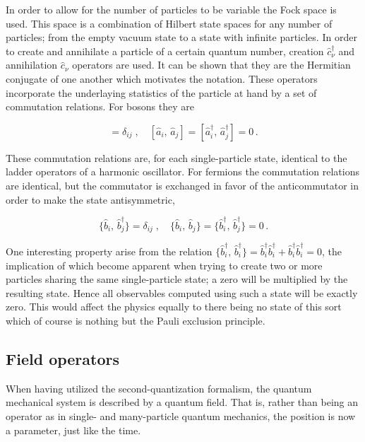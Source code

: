 \documentclass[12pt]{report}
\begin{document}
In order to allow for the number of particles to be variable the Fock space is used. This space is a combination of Hilbert state spaces for any number of particles; from the empty vacuum state to a state with infinite particles. In order to create and annihilate a particle of a certain quantum number, creation $ \hat c^\dagger_\nu $ and annihilation $ \hat c_\nu $ operators are used. It can be shown that they are the Hermitian conjugate of one another which motivates the notation. These operators incorporate the underlaying statistics of the particle at hand by a set of commutation relations. For bosons they are

\begin{equation}
	[\hat a_i, \, \hat a^\dagger_j] = \delta_{ij}
	\;, \quad
	[\hat a_i, \, \hat a_j] = [\hat a^\dagger_i, \, \hat a^\dagger_j] = 0 \,.
\end{equation}

These commutation relations are, for each single-particle state, identical to the ladder operators of a harmonic oscillator. For fermions the commutation relations are identical, but the commutator is exchanged in favor of the anticommutator in order to make the state antisymmetric,

\begin{equation}
	\{ \hat b_i, \, \hat b^\dagger_j \} = \delta_{ij}
	\;, \quad
	\{ \hat b_i, \, \hat b_j \} = \{ \hat b^\dagger_i, \, \hat b^\dagger_j \} = 0 \,.
\end{equation}

One interesting property arise from the relation $ \{ \hat b^\dagger_i , \, \hat b^\dagger_i \} = \hat b^\dagger_i \hat b^\dagger_i + \hat b^\dagger_i \hat b^\dagger_i = 0 $, the implication of which become apparent when trying to create two or more particles sharing the same single-particle state; a zero will be multiplied by the resulting state. Hence all observables computed using such a state will be exactly zero. This would affect the physics equally to there being no state of this sort which of course is nothing but the Pauli exclusion principle.

\subsection{Field operators}

When having utilized the second-quantization formalism, the quantum mechanical system is described by a quantum field. That is, rather than being an operator as in single- and many-particle quantum mechanics, the position is now a parameter, just like the time.
\end{document}
